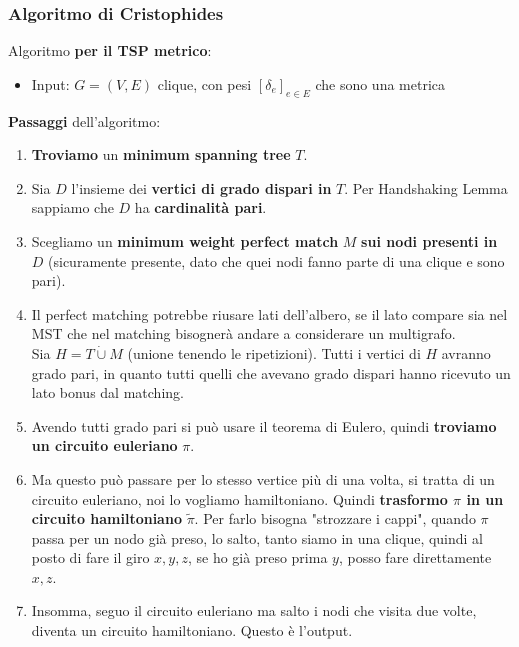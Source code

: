 \newpage

\subsubsection{Algoritmo di Cristophides}

Algoritmo \textbf{per il TSP metrico}:
\begin{itemize}
	\item Input: $G = (V,E)$ clique, con pesi $[\delta_e]_{e \in E}$ che sono una metrica
\end{itemize}

\textbf{Passaggi} dell'algoritmo:
\begin{enumerate}
	\item \textbf{Troviamo} un \textbf{minimum spanning tree} $T$.\\
	
	\item Sia $D$ l'insieme dei \textbf{vertici di grado dispari in} $T$. Per Handshaking Lemma sappiamo che $D$ ha \textbf{cardinalità pari}.\\
	
	\item Scegliamo un \textbf{minimum weight perfect match} $M$ \textbf{sui nodi presenti in} $D$ (sicuramente presente, dato che quei nodi fanno parte di una clique e sono pari).\\ 
	
	\item Il perfect matching potrebbe riusare lati dell'albero, se il lato compare sia nel MST che nel matching bisognerà andare a considerare un multigrafo. \\
	Sia $H = T \dot{\cup} M$ (unione tenendo le ripetizioni). Tutti i vertici di $H$ avranno grado pari, in quanto tutti quelli che avevano grado dispari hanno ricevuto un lato bonus dal matching.\\
	
	\item Avendo tutti grado pari si può usare il teorema di Eulero, quindi \textbf{troviamo un circuito euleriano} $\pi$.\\
	
	\item Ma questo può passare per lo stesso vertice più di una volta, si tratta di un circuito euleriano, noi lo vogliamo hamiltoniano. Quindi \textbf{trasformo $\pi$ in un circuito hamiltoniano} $\tilde \pi$. Per farlo bisogna "strozzare i cappi", quando $\pi$ passa per un nodo già preso, lo salto, tanto siamo in una clique, quindi al posto di fare il giro $x, y, z$, se ho già preso prima $y$, posso fare direttamente $x,z$.\\
	
	\item Insomma, seguo il circuito euleriano ma salto i nodi che visita due volte, diventa un circuito hamiltoniano. Questo è l'output.\\
\end{enumerate}

